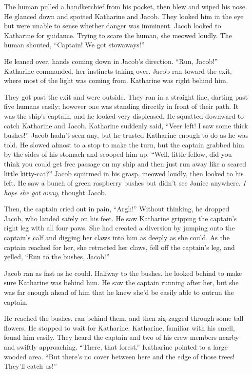 The human pulled a handkerchief from his pocket, then blew and wiped his nose. He glanced down and spotted Katharine and Jacob. They looked him in the eye but were unable to sense whether danger was imminent. Jacob looked to Katharine for guidance. Trying to scare the human, she meowed loudly. The human shouted, “Captain! We got stowaways!”

He leaned over, hands coming down in Jacob's direction. “Run, Jacob!” Katharine commanded, her instincts taking over. Jacob ran toward the exit, where most of the light was coming from. Katharine was right behind him.

They got past the exit and were outside. They ran in a straight line, darting past five humans easily; however one was standing directly in front of their path. It was the ship's captain, and he looked very displeased. He squatted downward to catch Katharine and Jacob. Katharine suddenly said, “Veer left! I saw some thick bushes!” Jacob hadn't seen any, but he trusted Katharine enough to do as he was told. He slowed almost to a stop to make the turn, but the captain grabbed him by the sides of his stomach and scooped him up. “Well, little fellow, did you think you could get free passage on my ship and then just run away like a scared little kitty-cat?” Jacob squirmed in his grasp, meowed loudly, then looked to his left. He saw a bunch of green raspberry bushes but didn't see Janice anywhere. \textit{I hope she got away}, thought Jacob.

Then, the captain cried out in pain, “Argh!” Without thinking, he dropped Jacob, who landed safely on his feet. He saw Katharine gripping the captain's right leg with all four paws. She had created a diversion by jumping onto the captain's calf and digging her claws into him as deeply as she could. As the captain reached for her, she retracted her claws, fell off the captain's leg, and yelled, “Run to the bushes, Jacob!”

Jacob ran as fast as he could. Halfway to the bushes, he looked behind to make sure Katharine was behind him. He saw the captain running after her, but she was far enough ahead of him that he knew she'd be easily able to outrun the captain.

He reached the bushes, ran behind them, and then zig-zagged through some tall flowers. He stopped to wait for Katharine. Katharine, familiar with his smell, found him easily. They heard the captain and two of his crew members nearby and swiftly approaching. “There, that forest.” Katharine pointed to a large wooded area. “But there's no cover between here and the edge of those trees! They'll catch us!”

